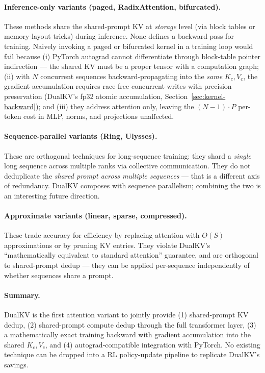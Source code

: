 \documentclass{article}
\begin{document}
\paragraph{Inference-only variants (paged, RadixAttention, bifurcated).} These methods share the shared-prompt KV at \emph{storage} level (via block tables or memory-layout tricks) during inference. None defines a backward pass for training. Naively invoking a paged or bifurcated kernel in a training loop would fail because (i) PyTorch autograd cannot differentiate through block-table pointer indirection --- the shared KV must be a proper tensor with a computation graph; (ii) with $N$ concurrent sequences backward-propagating into the \emph{same} $K_c, V_c$, the gradient accumulation requires race-free concurrent writes with precision preservation (DualKV's fp32 atomic accumulation, Section~\ref{sec:kernel-backward}); and (iii) they address attention only, leaving the $(N{-}1) \cdot P$ per-token cost in MLP, norms, and projections unaffected.

\paragraph{Sequence-parallel variants (Ring, Ulysses).} These are orthogonal techniques for long-sequence training: they shard a \emph{single} long sequence across multiple ranks via collective communication. They do not deduplicate the \emph{shared prompt across multiple sequences} --- that is a different axis of redundancy. DualKV composes with sequence parallelism; combining the two is an interesting future direction.

\paragraph{Approximate variants (linear, sparse, compressed).} These trade accuracy for efficiency by replacing attention with $O(S)$ approximations or by pruning KV entries. They violate DualKV's ``mathematically equivalent to standard attention'' guarantee, and are orthogonal to shared-prompt dedup --- they can be applied per-sequence independently of whether sequences share a prompt.

\paragraph{Summary.} DualKV is the first attention variant to jointly provide (1) shared-prompt KV dedup, (2) shared-prompt compute dedup through the full transformer layer, (3) a mathematically exact training backward with gradient accumulation into the shared $K_c, V_c$, and (4) autograd-compatible integration with PyTorch. No existing technique can be dropped into a RL policy-update pipeline to replicate DualKV's savings.

% 
\end{document}
